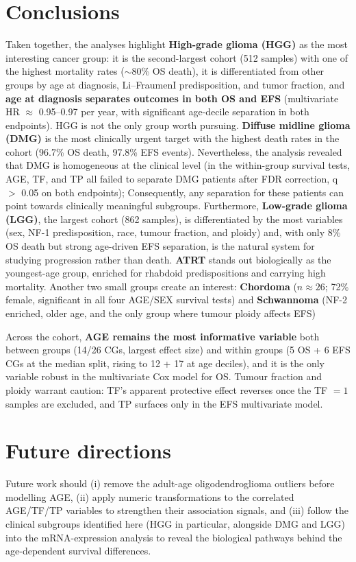 \documentclass[a4paper,11pt]{article}
\begin{document}
    
    



  
\section{Conclusions}

Taken together, the analyses highlight \textbf{High-grade glioma (HGG)} as the most interesting cancer group: it is the
second-largest cohort (512 samples) with one of the highest mortality rates ($\sim$80\% OS death), it is differentiated
from other groups by age at diagnosis, Li--FraumenI predisposition, and tumor fraction, and \textbf{age at diagnosis
separates outcomes in both OS and EFS} (multivariate HR $\approx$ 0.95--0.97 per year, with significant age-decile
separation in both endpoints). HGG is not the only group worth pursuing. \textbf{Diffuse midline glioma (DMG)} is 
the most clinically urgent target with the highest death rates in the cohort (96.7\% OS death, 97.8\% EFS events).
Nevertheless, the analysis revealed that DMG is homogeneous at the clinical level (in the within-group survival tests, AGE, TF, and TP all failed to separate DMG patients after FDR correction, q $>$ 0.05 on both endpoints);
Consequently, any separation for these patients can point towards clinically meaningful subgroups. 
Furthermore, \textbf{Low-grade glioma (LGG)}, 
the largest cohort (862 samples), is differentiated by the most variables
(sex, NF-1 predisposition, race, tumour fraction, and ploidy) and, with only 8\% OS death but strong age-driven EFS
separation, is the natural system for studying progression rather than death. \textbf{ATRT} stands out biologically as
the youngest-age group, enriched for rhabdoid predispositions and carrying high mortality. 
Another two small groups create an interest: \textbf{Chordoma}
($n \approx 26$; 72\% female, significant in all four AGE/SEX survival tests) and
\textbf{Schwannoma} (NF-2 enriched, older age, and the only group where tumour ploidy affects EFS) 

Across the cohort, \textbf{AGE remains the most informative variable} both between groups (14/26 CGs, largest effect
size) and within groups (5 OS + 6 EFS CGs at the median split, rising to 12 + 17 at age deciles), and it is the only
variable robust in the multivariate Cox model for OS. Tumour fraction and ploidy warrant caution: TF's apparent
protective effect reverses once the TF $= 1$ samples are excluded, and TP surfaces only in the EFS multivariate model.


\section{Future directions}
Future work should (i) remove the adult-age oligodendroglioma outliers before modelling AGE, (ii) apply numeric
transformations to the correlated AGE/TF/TP variables to strengthen their association signals, and (iii) follow the
clinical subgroups identified here (HGG in particular, alongside DMG and LGG) into the mRNA-expression analysis to
reveal the biological pathways behind the age-dependent survival differences.





\end{document}
